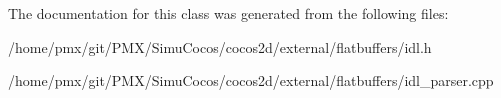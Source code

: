 The documentation for this class was generated from the following files\+:\begin{DoxyCompactItemize}
\item 
/home/pmx/git/\+P\+M\+X/\+Simu\+Cocos/cocos2d/external/flatbuffers/idl.\+h\item 
/home/pmx/git/\+P\+M\+X/\+Simu\+Cocos/cocos2d/external/flatbuffers/idl\+\_\+parser.\+cpp\end{DoxyCompactItemize}
